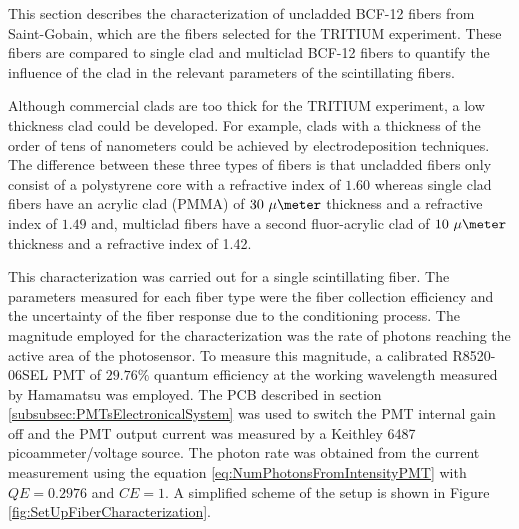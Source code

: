 This section describes the characterization of uncladded BCF-12 fibers from Saint-Gobain, which are the fibers selected for the TRITIUM experiment. These fibers are compared to single clad and multiclad BCF-12 fibers to quantify the influence of the clad in the relevant parameters of the scintillating fibers.

Although commercial clads are too thick for the TRITIUM experiment, a low thickness clad could be developed. For example, clads with a thickness of the order of tens of nanometers could be achieved by electrodeposition techniques. The difference between these three types of fibers is that uncladded fibers only consist of a polystyrene core with a refractive index of $1.60$ whereas single clad fibers have an acrylic clad (PMMA) of $30~\mu\meter$ thickness and a refractive index of $1.49$ and, multiclad fibers have a second fluor-acrylic clad of $10~\mu\meter$ thickness  and a refractive index of 1.42.




This characterization was carried out for a single scintillating fiber. The parameters measured for each fiber type were the fiber collection efficiency and the uncertainty of the fiber response due to the conditioning process. The magnitude employed for the characterization was the rate of photons reaching the active area of the photosensor. To measure this magnitude, a calibrated R8520-06SEL PMT of $29.76\%$ quantum efficiency at the working wavelength measured by Hamamatsu was employed. The PCB described in section \ref{subsubsec:PMTsElectronicalSystem} was used to switch the PMT internal gain off and the PMT output current was measured by a Keithley 6487 picoammeter/voltage source. The photon rate was obtained from the current measurement using the equation \ref{eq:NumPhotonsFromIntensityPMT} with $QE=0.2976$ and $CE=1$. A simplified scheme of the setup is shown in Figure \ref{fig:SetUpFiberCharacterization}.

